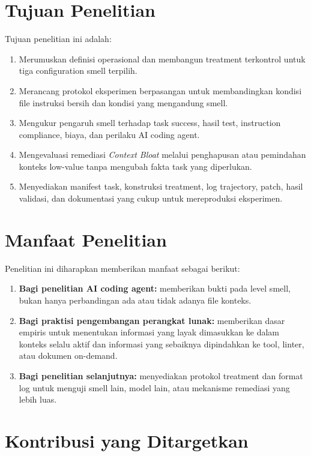 \section{Tujuan Penelitian}

Tujuan penelitian ini adalah:

\begin{enumerate}[leftmargin=*]
    \item Merumuskan definisi operasional dan membangun treatment terkontrol untuk tiga configuration smell terpilih.
    \item Merancang protokol eksperimen berpasangan untuk membandingkan kondisi file instruksi bersih dan kondisi yang mengandung smell.
    \item Mengukur pengaruh smell terhadap task success, hasil test, instruction compliance, biaya, dan perilaku AI coding agent.
    \item Mengevaluasi remediasi \textit{Context Bloat} melalui penghapusan atau pemindahan konteks low-value tanpa mengubah fakta task yang diperlukan.
    \item Menyediakan manifest task, konstruksi treatment, log trajectory, patch, hasil validasi, dan dokumentasi yang cukup untuk mereproduksi eksperimen.
\end{enumerate}

\section{Manfaat Penelitian}

Penelitian ini diharapkan memberikan manfaat sebagai berikut:

\begin{enumerate}[leftmargin=*]
    \item \textbf{Bagi penelitian AI coding agent:} memberikan bukti pada level smell, bukan hanya perbandingan ada atau tidak adanya file konteks.
    \item \textbf{Bagi praktisi pengembangan perangkat lunak:} memberikan dasar empiris untuk menentukan informasi yang layak dimasukkan ke dalam konteks selalu aktif dan informasi yang sebaiknya dipindahkan ke tool, linter, atau dokumen on-demand.
    \item \textbf{Bagi penelitian selanjutnya:} menyediakan protokol treatment dan format log untuk menguji smell lain, model lain, atau mekanisme remediasi yang lebih luas.
\end{enumerate}

\section{Kontribusi yang Ditargetkan}

